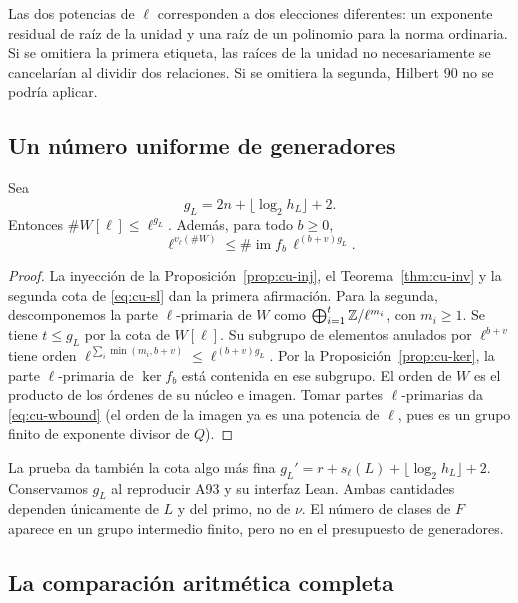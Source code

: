 Las dos potencias de $\ell$ corresponden a dos elecciones diferentes: un exponente residual de raíz de la unidad y una raíz de un polinomio para la norma ordinaria. Si se omitiera la primera etiqueta, las raíces de la unidad no necesariamente se cancelarían al dividir dos relaciones. Si se omitiera la segunda, Hilbert 90 no se podría aplicar.

\subsection{Un número uniforme de generadores}

\begin{proposicion}
\label{prop:cu-gen}
Sea
\begin{equation}
 g_L=2n+\lfloor\log_2h_L\rfloor+2.
 \label{eq:cu-gen}
\end{equation}
Entonces $\#W[\ell]\le\ell^{g_L}$. Además, para todo $b\ge0$,
\begin{equation}
 \ell^{v_\ell(\#W)}\le
 \#\operatorname{im}f_b\,\ell^{(b+v)g_L}.
 \label{eq:cu-wbound}
\end{equation}
\end{proposicion}
\begin{proof}
La inyección de la Proposición~\ref{prop:cu-inj}, el Teorema~\ref{thm:cu-inv} y la segunda cota de \eqref{eq:cu-sl} dan la primera afirmación. Para la segunda, descomponemos la parte $\ell$-primaria de $W$ como $\bigoplus_{i=1}^t\mathbb{Z}/\ell^{m_i}$, con $m_i\ge1$. Se tiene $t\le g_L$ por la cota de $W[\ell]$. Su subgrupo de elementos anulados por $\ell^{b+v}$ tiene orden
$\ell^{\sum_i\min(m_i,b+v)}\le\ell^{(b+v)g_L}$. Por la Proposición~\ref{prop:cu-ker}, la parte $\ell$-primaria de $\ker f_b$ está contenida en ese subgrupo. El orden de $W$ es el producto de los órdenes de su núcleo e imagen. Tomar partes $\ell$-primarias da \eqref{eq:cu-wbound} (el orden de la imagen ya es una potencia de $\ell$, pues es un grupo finito de exponente divisor de $Q$).
\end{proof}

La prueba da también la cota algo más fina $g_L'=r+s_\ell(L)+\lfloor\log_2h_L\rfloor+2$. Conservamos $g_L$ al reproducir A93 y su interfaz Lean. Ambas cantidades dependen únicamente de $L$ y del primo, no de $\nu$. El número de clases de $F$ aparece en un grupo intermedio finito, pero no en el presupuesto de generadores.

\subsection{La comparación aritmética completa}

